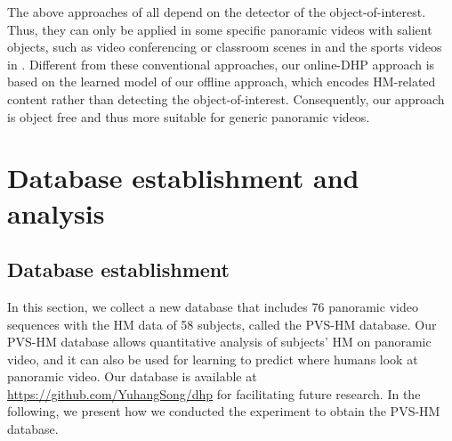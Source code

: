 \documentclass[10pt,journal,compsoc]{IEEEtran}
\begin{document}
The above approaches of \cite{foote2000flycam, sun2005region, su2016pano2vid, hu2017deep, lin2017tell}  all depend on the detector of the object-of-interest. Thus, they can only be applied in some specific panoramic videos with salient objects, such as video conferencing or classroom scenes in \cite{foote2000flycam, sun2005region} and the sports videos in \cite{su2016pano2vid, hu2017deep, lin2017tell}. Different from these conventional approaches, our online-DHP approach is based on the learned model of our offline approach, which encodes HM-related content rather than detecting the object-of-interest. Consequently, our approach is object free and thus more suitable for generic panoramic videos.











\section{Database establishment and analysis}
\label{Database_establishment_and_analysis}

\subsection{Database establishment}
\label{Database_establishment}

In this section, we collect a new database that includes 76 panoramic video sequences with the HM data of 58 subjects, called the PVS-HM database. Our PVS-HM database allows quantitative analysis of subjects' HM on panoramic video, and it can also be used for learning to predict where humans look at panoramic video. Our database is available at  \url{https://github.com/YuhangSong/dhp} for facilitating future research. In the following, we present how we conducted the experiment to obtain the PVS-HM database.
\end{document}
